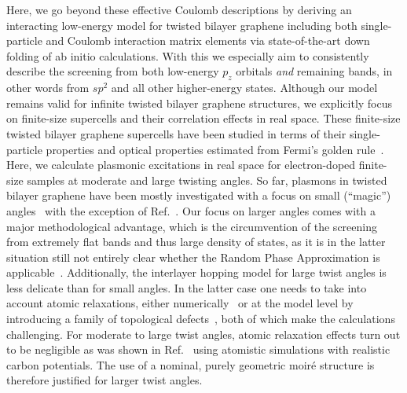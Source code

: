 Here, we go beyond these effective Coulomb descriptions by deriving an interacting low-energy model for twisted bilayer graphene including both single-particle and Coulomb interaction matrix elements via state-of-the-art down folding of ab initio calculations.  With this we especially aim to consistently describe the screening from both low-energy $p_z$ orbitals \emph{and} remaining bands, in other words from $sp^2$ and all other higher-energy states.  Although our model remains valid for infinite twisted bilayer graphene structures, we explicitly focus on finite-size supercells and their correlation effects in real space. These finite-size twisted bilayer graphene supercells have been studied in terms of their single-particle properties and optical properties estimated from Fermi's golden rule~\cite{mirzakhani2020circular,tepliakov2020twisted}. Here, we calculate plasmonic excitations in real space for electron-doped finite-size samples at moderate and large twisting angles. So far, plasmons in twisted bilayer graphene have been mostly investigated with a focus on small (``magic'') angles~\cite{sunku_photonic_2018,lewandowski_intrinsically_2019,Hesp_2021_Observation_of,novelli_optical_2020,kuang2021collective} with the exception of Ref.~\cite{hu_real-space_2017}.  Our focus on larger angles comes with a major methodological advantage, which is the circumvention of the screening from extremely flat bands and thus large density of states, as it is in the latter situation still not entirely clear whether the Random Phase Approximation is applicable~\cite{katsnelson_anomalies_1985,irkhin_robustness_2002,stepanov_coexisting_2021}. Additionally, the interlayer hopping model for large twist angles is less delicate than for small angles. In the latter case one needs to take into account atomic relaxations, either numerically~\cite{shi_large-area_2020} or at the model level by introducing a family of topological defects~\cite{gornostyrev_origin_2020}, both of which make the calculations challenging. For moderate to large twist angles, atomic relaxation effects turn out to be negligible as was shown in Ref.~\cite{wijk_relaxation_2015} using atomistic simulations with realistic carbon potentials. The use of a nominal, purely geometric moir{\'e} structure is therefore justified for larger twist angles. 
    
